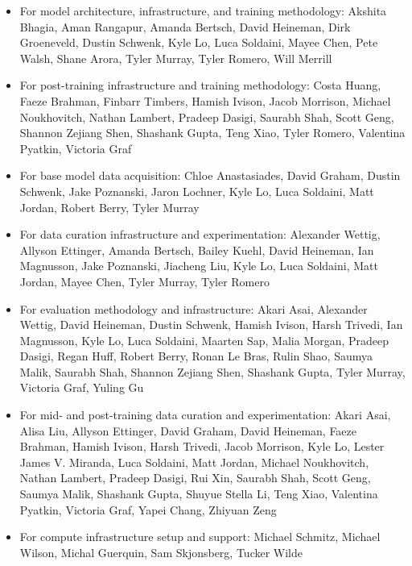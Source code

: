 \documentclass[table]{ai2style/ai2}
\begin{document}
{{\begin{itemize}
    \item For model architecture, infrastructure, and training methodology: Akshita Bhagia, Aman Rangapur, Amanda Bertsch, David Heineman, Dirk Groeneveld, Dustin Schwenk, Kyle Lo, Luca Soldaini, Mayee Chen, Pete Walsh, Shane Arora, Tyler Murray, Tyler Romero, Will Merrill

    \item For post-training infrastructure and training methodology: Costa Huang, Faeze Brahman, Finbarr Timbers, Hamish Ivison, Jacob Morrison, Michael Noukhovitch, Nathan Lambert, Pradeep Dasigi, Saurabh Shah, Scott Geng, Shannon Zejiang Shen, Shashank Gupta, Teng Xiao, Tyler Romero, Valentina Pyatkin, Victoria Graf

    \item For base model data acquisition: Chloe Anastasiades, David Graham, Dustin Schwenk, Jake Poznanski, Jaron Lochner, Kyle Lo, Luca Soldaini, Matt Jordan, Robert Berry, Tyler Murray

    \item For data curation infrastructure and experimentation: Alexander Wettig, Allyson Ettinger, Amanda Bertsch, Bailey Kuehl, David Heineman, Ian Magnusson, Jake Poznanski, Jiacheng Liu, Kyle Lo, Luca Soldaini, Matt Jordan, Mayee Chen, Tyler Murray, Tyler Romero

    \item For evaluation methodology and infrastructure: Akari Asai, Alexander Wettig, David Heineman, Dustin Schwenk, Hamish Ivison, Harsh Trivedi, Ian Magnusson, Kyle Lo, Luca Soldaini, Maarten Sap, Malia Morgan, Pradeep Dasigi, Regan Huff, Robert Berry, Ronan Le Bras, Rulin Shao, Saumya Malik, Saurabh Shah, Shannon Zejiang Shen, Shashank Gupta, Tyler Murray, Victoria Graf, Yuling Gu

    \item For mid- and post-training data curation and experimentation: Akari Asai, Alisa Liu, Allyson Ettinger, David Graham, David Heineman, Faeze Brahman, Hamish Ivison, Harsh Trivedi, Jacob Morrison, Kyle Lo, Lester James V. Miranda, Luca Soldaini, Matt Jordan, Michael Noukhovitch, Nathan Lambert, Pradeep Dasigi, Rui Xin, Saurabh Shah, Scott Geng, Saumya Malik, Shashank Gupta, Shuyue Stella Li, Teng Xiao, Valentina Pyatkin, Victoria Graf, Yapei Chang, Zhiyuan Zeng

    \item For compute infrastructure setup and support: Michael Schmitz, Michael Wilson, Michal Guerquin, Sam Skjonsberg, Tucker Wilde


\end{itemize}}}
\end{document}
